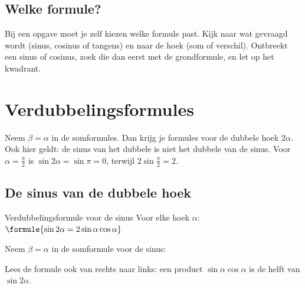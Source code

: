 \begin{oefeningen}
\end{oefeningen}

\subsection{Welke formule?}

Bij een opgave moet je zelf kiezen welke formule past. Kijk naar wat gevraagd wordt (sinus, cosinus of tangens) en naar de hoek (som of verschil). Ontbreekt een sinus of cosinus, zoek die dan eerst met de grondformule, en let op het kwadrant.

\begin{oefeningen}

\end{oefeningen}

\section{Verdubbelingsformules}

Neem $\beta = \alpha$ in de somformules. Dan krijg je formules voor de dubbele hoek $2\alpha$. Ook hier geldt: de sinus van het dubbele is niet het dubbele van de sinus. Voor $\alpha = \frac{\pi}{2}$ is $\sin 2\alpha = \sin\pi = 0$, terwijl $2\sin\frac{\pi}{2} = 2$.

\subsection{De sinus van de dubbele hoek}

\begin{theorie}
\begin{stelling}{Verdubbelingsformule voor de sinus}
Voor elke hoek $\alpha$: \quad $\formule{\sin 2\alpha = 2\sin\alpha\cos\alpha}$
\end{stelling}
\begin{bewijs}
Neem $\beta = \alpha$ in de somformule voor de sinus:
\end{bewijs}
\end{theorie}

Lees de formule ook van rechts naar links: een product $\sin\alpha\cos\alpha$ is de helft van $\sin 2\alpha$.

